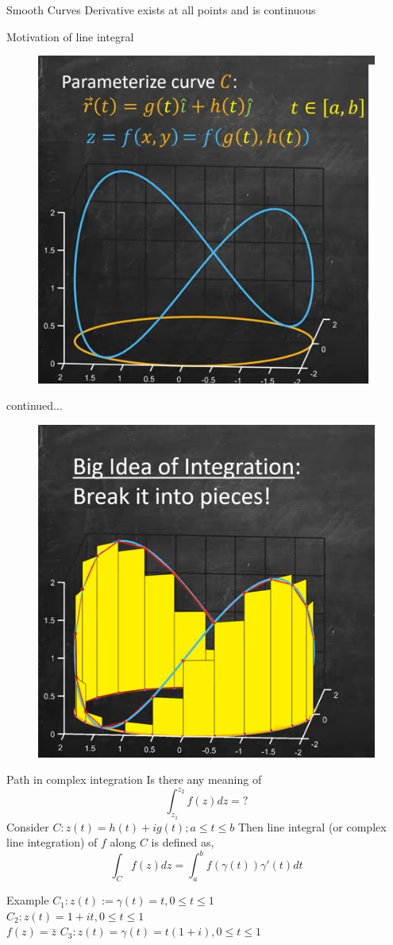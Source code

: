 \documentclass[11pt]{beamer}
\theoremstyle{plain}
\begin{document}
\begin{frame}{Smooth Curves}
    Derivative exists at all points and is continuous 
\end{frame}

\begin{frame}{Motivation of line integral}
\begin{figure}
    \centering
    \includegraphics[width=0.5\linewidth]{Line_integral.png}
\end{figure}
\end{frame}

\begin{frame}{continued...}
    \begin{figure}
        \centering
        \includegraphics[width=0.5\linewidth]{line_integral_2.png}
    \end{figure}
\end{frame}

\begin{frame}{Path in complex integration}
    Is there any meaning of $$\int_{z_1}^{z_2}f(z)dz=?$$
    \pause
    Consider $C:z(t)=h(t)+ig(t); a\leq t\leq b$
    Then line integral (or complex line integration) of $f$ along $C$ is defined as, 
    $$\int_C f(z) dz=\int_a^b f(\gamma(t))\gamma'(t)dt$$
\end{frame}


\begin{frame}{Example}
    $C_1:z(t):=\gamma(t)=t, 0\leq t\leq 1$\\
    $C_2:z(t)=1+it, 0\leq t\leq 1$\\
    $f(z)=\bar z$
    $C_3:z(t)=\gamma(t)=t(1+i),0\leq t\leq 1$
\end{frame}
\end{document}
